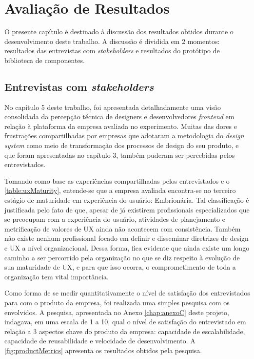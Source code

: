 
\chapter{Avaliação de Resultados}
\label{chap:resultados}

O presente capítulo é destinado à discussão dos resultados obtidos durante o desenvolvimento deste trabalho. A discussão é dividida em 2 momentos: resultados das entrevistas com \textit{stakeholders} e resultados do protótipo de biblioteca de componentes.

\section{Entrevistas com \textit{stakeholders}}
\label{sec:resEntrevistas}

No capítulo 5 deste trabalho, foi apresentada detalhadamente uma visão consolidada da percepção técnica de designers e desenvolvedores \textit{frontend} em relação à plataforma da empresa avaliada no experimento. Muitas das dores e frustrações compartilhadas por empresas que adotaram a metodologia do \textit{design system} como meio de transformação dos processos de design do seu produto, e que foram apresentadas no capítulo 3, também puderam ser percebidas pelos entrevistados.

Tomando como base as experiências compartilhadas pelos entrevistados e o \autoref{table:uxMaturity}, entende-se que a empresa avaliada encontra-se no terceiro estágio de maturidade em experiência do usuário: Embrionária. Tal classificação é justificada pelo fato de que, apesar de já existirem profissionais especializados que se preocupam com a experiência do usuário, atividades de planejamento e metrificação de valores de UX ainda não acontecem com consistência. Também não existe nenhum profissional focado em definir e disseminar diretrizes de design e UX a nível organizacional. Dessa forma, fica evidente que ainda existe um longo caminho a ser percorrido pela organização no que se diz respeito à evolução de sua maturidade de UX, e para que isso ocorra, o comprometimento de toda a organização tem vital importância.

Como forma de se medir quantitativamente o nível de satisfação dos entrevistados para com o produto da empresa, foi realizada uma simples pesquisa com os envolvidos. A pesquisa, apresentada no Anexo \ref{chap:anexoC} deste projeto, indagava, em uma escala de 1 a 10, qual o nível de satisfação do entrevistado em relação a 3 aspectos chave do produto da empresa: capacidade de escalabilidade, capacidade de reusabilidade e velocidade de desenvolvimento. A \autoref{fig:productMetrics} apresenta os resultados obtidos pela pesquisa.

